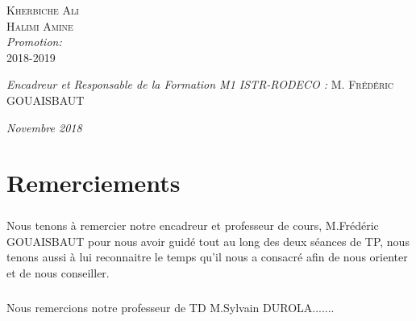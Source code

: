 \documentclass[12pt, a4paper, openany]{report}
\begin{document}
\begin{titlepage}
\begin{sffamily}
\begin{center}
    \begin{minipage}{0.4\textwidth}
      \begin{flushleft} \large
         \textsc{Kherbiche Ali}\\
         \textsc{Halimi Amine}\\
        \emph {Promotion:} \\
         \textsc{2018-2019}\\
      \end{flushleft}
    \end{minipage}
    \begin{minipage}{0.4\textwidth}
      \begin{flushright} \large
        \emph{Encadreur et Responsable de la Formation M1 ISTR-RODECO :}  \textsc{M. Frédéric GOUAISBAUT}\\
      \end{flushright}
    \end{minipage}

    \vfill

    \emph{\large Novembre 2018}

  \end{center}
  \end{sffamily}      
          
  \end{titlepage}
  
\makeatother



\chapter*{Remerciements}
  
  \paragraph{}
   Nous tenons à remercier notre encadreur et professeur de cours, M.Frédéric GOUAISBAUT pour nous avoir guidé tout au long des deux séances de TP, nous tenons aussi à lui reconnaitre le temps qu'il nous a consacré afin de nous orienter et de nous conseiller.\\
  \paragraph{}
   Nous remercions notre professeur de TD M.Sylvain DUROLA.......     
   
\end{document}
